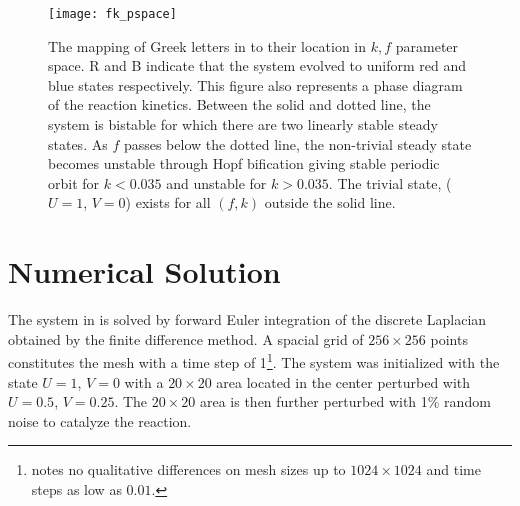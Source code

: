 \begin{figure}[h]
\begin{center}
\texttt{[image: fk\_pspace]}
\caption{\label{fig:fk_pspace} The mapping of Greek letters in  to their location in $k,f$ parameter space. R and B indicate that the system evolved to uniform red and blue states respectively. This figure also represents a phase diagram of the reaction kinetics. Between the solid and dotted line, the system is bistable for which there are two linearly stable steady states. As $f$ passes below the dotted line, the non-trivial steady state becomes unstable through Hopf bification giving stable periodic orbit for $k < 0.035$ and unstable for $k > 0.035$. The trivial state, ($U =1$, $V = 0$) exists for all $(f,k)$ outside the solid line.}
\end{center}
\end{figure}

\section{Numerical Solution}

The system in  is solved by forward Euler integration of the discrete Laplacian obtained by the finite difference method. A spacial grid of $256 \times 256$ points constitutes the mesh with a time step of 1\footnote{ notes no qualitative differences on mesh sizes up to $1024 \times 1024$ and time steps as low as $0.01$.}. The system was initialized with the state $U=1$, $V=0$ with a $20 \times 20$ area located in the center perturbed with $U=0.5$, $V=0.25$. The $20 \times 20$ area is then further perturbed with 1\% random noise to catalyze the reaction.
